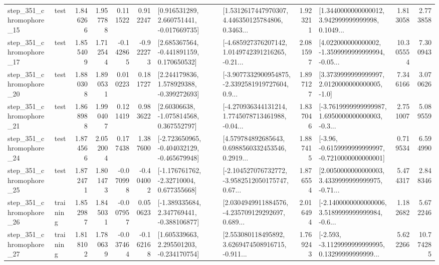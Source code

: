 \begin{tabular}{llrrrrllrlrr}
  step\_351\_chromophore\_15 &      test &      1.846266 &    1.957788 &      0.111522 &  0.912247 &    [0.916531289, 2.660751441, -0.017669735] &  [1.5312617447970307, 4.446350125784806, 0.3463... &       1.923211 &  [1.3440000000000012, 3.942999999999998, 0.1049... &            1.813058 &          2.773858 \\
  step\_351\_chromophore\_17 &      test &      1.855409 &    1.712544 &     -0.142865 & -0.922273 &    [2.685367564, -0.441891159, 0.170650532] &  [-4.685927376207142, 1.0149742391216265, -0.21... &       2.081597 &  [4.022000000000002, -1.3599999999999994, -0.05... &           10.305554 &          7.300943 \\
  step\_351\_chromophore\_20 &      test &      1.880308 &    1.890531 &      0.010223 &  0.181727 &    [2.244179836, 1.578929388, -0.399272693] &  [-3.9077332900954875, -2.3392581919727604, 0.9... &       1.897127 &     [3.3739999999999997, 2.0120000000000005, -1.0] &            7.346166 &          3.070626 \\
  step\_351\_chromophore\_21 &      test &      1.868988 &    1.990407 &      0.121419 &  0.983622 &     [2.60306638, -1.075814568, 0.367552797] &  [-4.270936344131214, 1.7745078713461988, -0.04... &       1.837046 &  [-3.7619999999999987, 1.6950000000000003, -0.3... &            2.751007 &          5.089559 \\
  step\_351\_chromophore\_24 &      test &      1.874566 &    2.052004 &      0.177438 &  1.387600 &  [-2.723650965, -0.404032129, -0.465679948] &  [4.579784892685643, 0.6988560332453546, 0.2919... &       1.887415 &  [-3.96, -0.6159999999999997, -0.7210000000000001] &            0.719534 &          6.594990 \\
  step\_351\_chromophore\_25 &      test &      1.872471 &    1.801473 &     -0.070998 & -0.404002 &    [-1.176761762, -2.32710004, 0.677355668] &  [-2.104527076732772, -3.9582512050175747, 0.67... &       1.876554 &  [2.0050000000000003, 3.4339999999999975, -0.71... &            5.474317 &          2.848346 \\
  step\_351\_chromophore\_26 &  training &      1.852987 &    1.845031 &     -0.007957 &  0.050623 &   [-1.389335684, 2.347769441, -0.388106877] &  [2.0304949911884576, -4.235709129292697, 0.689... &       2.016494 &  [-2.1400000000000006, 3.5189999999999984, -0.6... &            1.182682 &          5.672246 \\
  step\_351\_chromophore\_27 &  training &      1.818102 &    1.780639 &     -0.037464 & -0.162168 &    [1.605339663, 2.295501203, -0.234170754] &  [2.553080118495892, 3.6269474508916715, -0.911... &       1.769243 &  [-2.593, -3.1129999999999995, 0.13299999999999... &            5.622266 &         10.774285 \\

\end{tabular}
